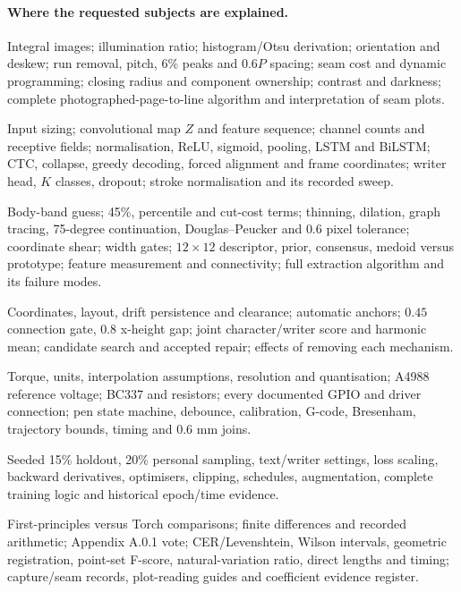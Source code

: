\paragraph{Where the requested subjects are explained.}
\begin{description}[style=nextline]
\item[Segmentation, Section~\ref{sec:expand-segment}.] Integral images;
illumination ratio; histogram/Otsu derivation; orientation and deskew;
run removal, pitch, 6\% peaks and $0.6P$ spacing; seam cost and dynamic
programming; closing radius and component ownership; contrast and darkness;
complete photographed-page-to-line algorithm and interpretation of seam plots.
\item[Recognition, Section~\ref{sec:expand-recognise}.] Input sizing;
convolutional map $Z$ and feature sequence; channel counts and receptive fields;
normalisation, ReLU, sigmoid, pooling, LSTM and BiLSTM; CTC, collapse,
greedy decoding, forced alignment and frame coordinates; writer head,
$K$ classes, dropout; stroke normalisation and its recorded sweep.
\item[Profiles, Section~\ref{sec:expand-style}.] Body-band guess;
45\%, percentile and cut-cost terms; thinning, dilation, graph tracing,
75-degree continuation, Douglas--Peucker and $0.6$ pixel tolerance;
coordinate shear; width gates; $12\times12$ descriptor, prior, consensus,
medoid versus prototype; feature measurement and connectivity; full extraction
algorithm and its failure modes.
\item[Synthesis, Section~\ref{sec:expand-synth}.] Coordinates, layout,
drift persistence and clearance; automatic anchors; $0.45$ connection gate,
$0.8$ x-height gap; joint character/writer score and harmonic mean;
candidate search and accepted repair; effects of removing each mechanism.
\item[Motion and electronics, Section~\ref{sec:expand-hardware}.] Torque,
units, interpolation assumptions, resolution and quantisation;
A4988 reference voltage; BC337 and resistors; every documented GPIO and driver
connection; pen state machine, debounce, calibration, G-code, Bresenham,
trajectory bounds, timing and $0.6$ mm joins.
\item[Training, Section~\ref{sec:expand-train}.] Seeded 15\% holdout,
20\% personal sampling, text/writer settings, loss scaling, backward
derivatives, optimisers, clipping, schedules, augmentation, complete training
logic and historical epoch/time evidence.
\item[Verification, Chapter~\ref{ch:expand-verification}.] First-principles
versus Torch comparisons; finite differences and recorded arithmetic;
Appendix A.0.1 vote; CER/Levenshtein, Wilson intervals, geometric registration,
point-set F-score, natural-variation ratio, direct lengths and timing;
capture/seam records, plot-reading guides and coefficient evidence register.
\end{description}

